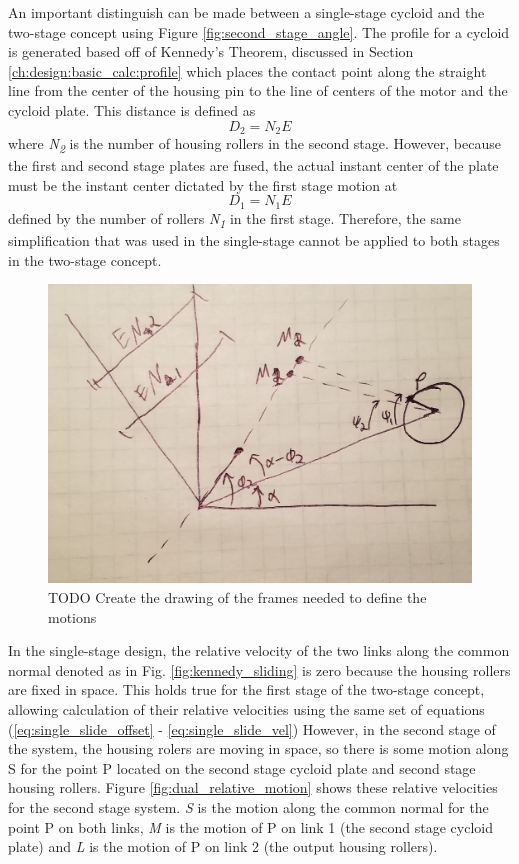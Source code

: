An important distinguish can be made between a single-stage cycloid and the two-stage concept using Figure \ref{fig:second_stage_angle}. The profile for a cycloid is generated based off of Kennedy's Theorem, discussed in Section \ref{ch:design:basic_calc:profile} which places the contact point along the straight line from the center of the housing pin to the line of centers of the motor and the cycloid plate. This distance is defined as 
\begin{equation}
D_2 = N_2 E
\end{equation} 
where \textit{N\textsubscript{2}} is the number of housing rollers in the second stage. However, because the first and second stage plates are fused, the actual instant center of the plate must be the instant center dictated by the first stage motion at 
\begin{equation}
D_1 = N_1 E 
\end{equation} 
defined by the number of rollers \textit{N\textsubscript{1}} in the first stage. Therefore, the same simplification that was used in the single-stage cannot be applied to both stages in the two-stage concept. 

\begin{figure}[h]
	\centering
	\includegraphics[width=0.50\linewidth]{fig/two_stage_angle_TODO}
   \caption{TODO Create the drawing of the frames needed to define the motions}
   \label{fig:two_stage_angles}
\end{figure}

In the single-stage design, the relative velocity of the two links along the common normal denoted as  in Fig. \ref{fig:kennedy_sliding} is zero because the housing rollers are fixed in space. This holds true for the first stage of the two-stage concept, allowing calculation of their relative velocities using the same set of equations (\ref{eq:single_slide_offset} - \ref{eq:single_slide_vel}) However, in the second stage of the system, the housing rolers are moving in space, so there is some motion along S for the point P located on the second stage cycloid plate and second stage housing rollers. Figure \ref{fig:dual_relative_motion} shows these relative velocities for the second stage system. \textit{S} is the motion along the common normal for the point P on both links, \textit{M} is the motion of P on link 1 (the second stage cycloid plate) and \textit{L} is the motion of P on link 2 (the output housing rollers). 

